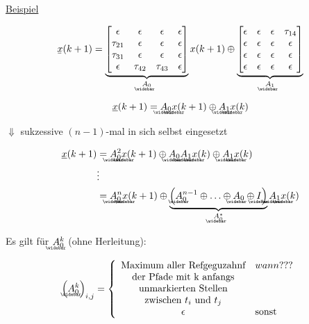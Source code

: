 \underline{Beispiel}


\begin{equation}
	\ubar{x}(k+1) = 
	\underbrace{
		\m{
		\epsilon & \epsilon & \epsilon & \epsilon \\
		\tau_{21} & \epsilon & \epsilon & \epsilon \\
		\tau_{31} & \epsilon & \epsilon & \epsilon \\
		\epsilon & \tau_{42} & \tau_{43} & \epsilon \\
		}
	}_{\wbar{A}_0}
	x(k+1) 
	\oplus
	\underbrace{
		\m{
			\epsilon & \epsilon & \epsilon & \tau_{14} \\
			\epsilon & \epsilon & \epsilon & \epsilon \\
			\epsilon & \epsilon & \epsilon & \epsilon \\
			\epsilon & \epsilon & \epsilon & \epsilon \\
		}
	}_{\wbar{A}_1}
\end{equation}


\begin{equation}
	\underline{x}(k+1) = \wbar{A}_0 \wbar{x}(k+1) \oplus \wbar{A}_1 \wbar{x}(k)
\end{equation}

\begin{center}
	$\Downarrow$ sukzessive $(n-1)$-mal in sich selbst eingesetzt
\end{center}

\begin{align}
	\underline{x}(k+1) &= \wbar{A}_0^2 \wbar{x}(k+1) 
	\oplus \wbar{A}_0 \wbar{A}_1 \wbar{x}(k)
	\oplus \wbar{A}_1 \wbar{x}(k) \\
	&\vdots \nonumber \\
	&= \wbar{A}_0^n \wbar{x}(k+1) 
	\oplus \underbrace{\left( \wbar{A}_0^{n-1} \oplus \ldots \oplus \wbar{A}_0 \oplus \wbar{I} \right)}_{\wbar{A}_0^\ast} \wbar{A}_1 \wbar{x}(k)
\end{align}

Es gilt für $\wbar{A}_0^k$ (ohne Herleitung):

\begin{equation}
	\left( \wbar{A}_0^k \right)_{i,j} = 
	\left\{
	\begin{array}{cl}
		\text{Maximum aller Refgeguzahnf} & wann???\\
		\text{der Pfade mit k anfangs}\\
		\text{unmarkierten Stellen}\\
		\text{zwischen~} t_i \text{~und~} t_j \\
		\epsilon & \text{sonst}
	\end{array}
	\right.
\end{equation}

